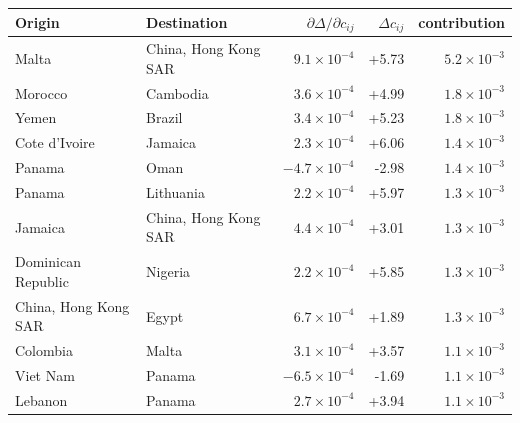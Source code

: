 \begin{tabular}{llrrr}
\toprule
Origin & Destination & $\partial\Delta/\partial c_{ij}$ & $\Delta c_{ij}$ & contribution\\
\midrule
Malta & China, Hong Kong SAR & $9.1\times10^{-4}$ & +5.73 & $5.2\times10^{-3}$\\
Morocco & Cambodia & $3.6\times10^{-4}$ & +4.99 & $1.8\times10^{-3}$\\
Yemen & Brazil & $3.4\times10^{-4}$ & +5.23 & $1.8\times10^{-3}$\\
Cote d'Ivoire & Jamaica & $2.3\times10^{-4}$ & +6.06 & $1.4\times10^{-3}$\\
Panama & Oman & $-4.7\times10^{-4}$ & -2.98 & $1.4\times10^{-3}$\\
Panama & Lithuania & $2.2\times10^{-4}$ & +5.97 & $1.3\times10^{-3}$\\
Jamaica & China, Hong Kong SAR & $4.4\times10^{-4}$ & +3.01 & $1.3\times10^{-3}$\\
Dominican Republic & Nigeria & $2.2\times10^{-4}$ & +5.85 & $1.3\times10^{-3}$\\
China, Hong Kong SAR & Egypt & $6.7\times10^{-4}$ & +1.89 & $1.3\times10^{-3}$\\
Colombia & Malta & $3.1\times10^{-4}$ & +3.57 & $1.1\times10^{-3}$\\
Viet Nam & Panama & $-6.5\times10^{-4}$ & -1.69 & $1.1\times10^{-3}$\\
Lebanon & Panama & $2.7\times10^{-4}$ & +3.94 & $1.1\times10^{-3}$\\
\bottomrule
\end{tabular}
